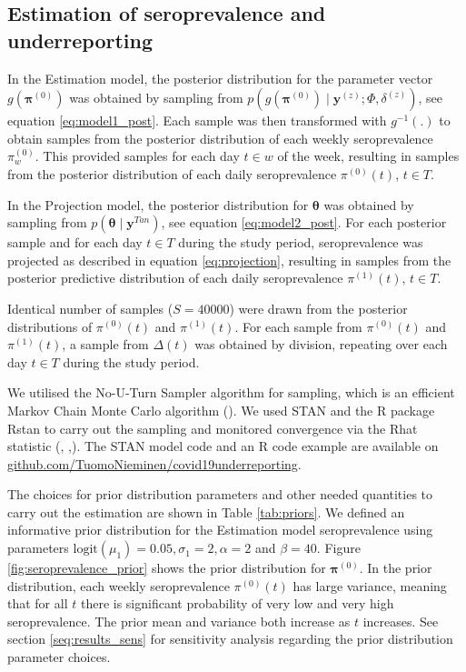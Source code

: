 \documentclass[aoas]{imsart}
\begin{document}
\subsection{Estimation of seroprevalence and underreporting} \label{seq:estimation}

In the Estimation model, the posterior distribution for the parameter vector $g(\mathbf{\pi}^{(0)})$ was obtained by sampling from $p(g(\mathbf{\pi}^{(0)}) \mid \mathbf{y}^{(z)}; \Phi, \delta^{(z)})$, see equation \ref{eq:model1_post}. Each sample was then transformed with $g^{-1}(.)$ to obtain samples from the posterior distribution of each weekly seroprevalence $\pi_w^{(0)}$. This provided samples for each day $t \in w$ of the week, resulting in samples from the posterior distribution of each daily seroprevalence $\pi^{(0)}(t)$, $t \in T$. 

In the Projection model, the posterior distribution for $\mathbf{\theta}$ was obtained by sampling from $p(\mathbf{\theta} \mid \mathbf{y}^{Tan})$, see equation \ref{eq:model2_post}. For each posterior sample and for each day $t \in T$ during the study period, seroprevalence was projected as described in equation \ref{eq:projection}, resulting in samples from the posterior predictive distribution of each daily seroprevalence $\pi^{(1)}(t)$, $t \in T$. 

Identical number of samples ($S=40000$) were drawn from the posterior distributions of $\pi^{(0)}(t)$ and $\pi^{(1)}(t)$. For each sample from $\pi^{(0)}(t)$ and $\pi^{(1)}(t)$, a sample from $\Delta(t)$ was obtained by division, repeating over each day $t \in T$ during the study period. 

We utilised the No-U-Turn Sampler algorithm for sampling, which is an efficient Markov Chain Monte Carlo algorithm (\cite{homan2014}). We used STAN and the R package Rstan to carry out the sampling and monitored convergence via the Rhat statistic (\cite{carpenter2017}, \cite{R2021} ,\cite{standev2020rstan}). The STAN model code and an R code example are available on \url{github.com/TuomoNieminen/covid19underreporting}.

The choices for prior distribution parameters and other needed quantities to carry out the estimation are shown in Table \ref{tab:priors}. We defined an informative prior distribution for the Estimation model seroprevalence using parameters $\text{logit}(\mu_1) = 0.05, \sigma_1 = 2, \alpha = 2$ and $\beta = 40$. Figure \ref{fig:seroprevalence_prior} shows the prior distribution for $\mathbf{\pi}^{(0)}$. In the prior distribution, each weekly seroprevalence $\pi^{(0)}(t)$ has large variance, meaning that for all $t$ there is significant probability of very low and very high seroprevalence. The prior mean and variance both increase as $t$ increases. See section \ref{seq:results_sens} for sensitivity analysis regarding the prior distribution parameter choices.
\end{document}
